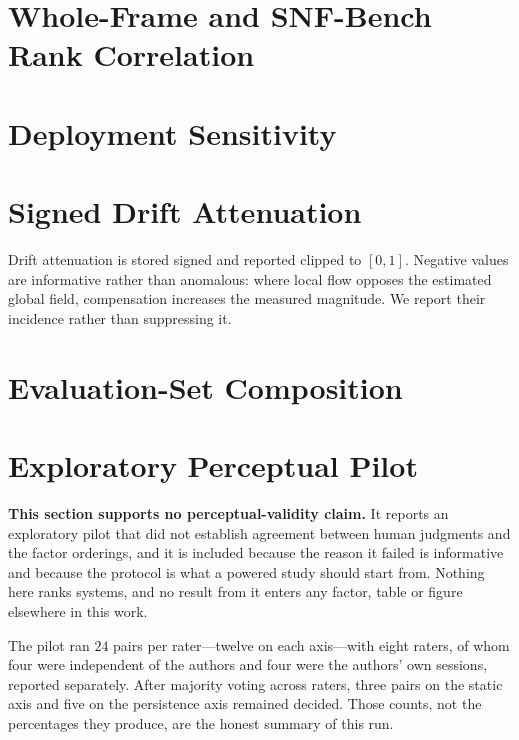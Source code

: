 \documentclass[10pt,twocolumn,letterpaper]{article}
\begin{document}


\section{Whole-Frame and SNF-Bench Rank Correlation}
\label{sup:disagreement}




\section{Deployment Sensitivity}
\label{sup:deployment}



\section{Signed Drift Attenuation}
\label{sup:dar}



Drift attenuation is stored signed and reported clipped to $[0,1]$. Negative
values are informative rather than anomalous: where local flow opposes the
estimated global field, compensation increases the measured magnitude. We report
their incidence rather than suppressing it.

\section{Evaluation-Set Composition}
\label{sup:categories}



\section{Exploratory Perceptual Pilot}
\label{sup:perceptual}

\textbf{This section supports no perceptual-validity claim.} It reports an
exploratory pilot that did not establish agreement between human judgments and
the factor orderings, and it is included because the reason it failed is
informative and because the protocol is what a powered study should start from.
Nothing here ranks systems, and no result from it enters any factor, table or
figure elsewhere in this work.

The pilot ran $24$ pairs per rater---twelve on each axis---with eight raters, of
whom four were independent of the authors and four were the authors' own
sessions, reported separately. After majority voting across raters, three pairs
on the static axis and five on the persistence axis remained decided. Those
counts, not the percentages they produce, are the honest summary of this run.
\end{document}
